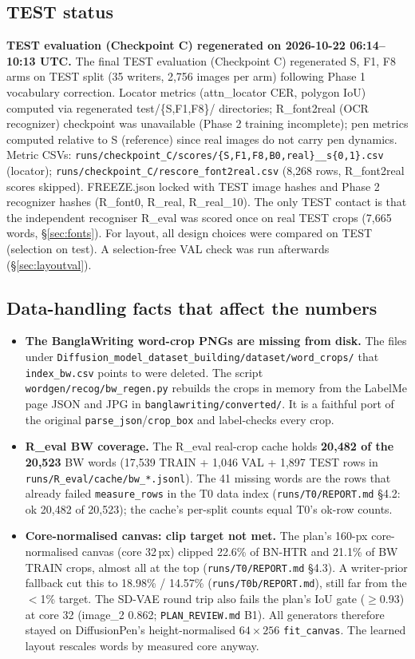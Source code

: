 \documentclass[10.5pt,a4paper]{article}
\newcommand{\fp}[1]{\nolinkurl{#1}}
\begin{document}
\subsection{TEST status}
\textbf{TEST evaluation (Checkpoint C) regenerated on 2026-10-22 06:14--10:13 UTC.} The final TEST evaluation
(Checkpoint C) regenerated S, F1, F8 arms on TEST split (35 writers, 2,756 images per arm) following Phase 1
vocabulary correction. Locator metrics (attn\_locator CER, polygon IoU) computed via regenerated test/\{S,F1,F8\}/
directories; R\_font2real (OCR recognizer) checkpoint was unavailable (Phase 2 training incomplete); pen metrics
computed relative to S (reference) since real images do not carry pen dynamics. Metric CSVs:
\fp{runs/checkpoint\_C/scores/\{S,F1,F8,B0,real\}\_\_s\{0,1\}.csv} (locator);
\fp{runs/checkpoint\_C/rescore\_font2real.csv} (8,268 rows, R\_font2real scores skipped).
FREEZE.json locked with TEST image hashes and Phase 2 recognizer hashes (R\_font0, R\_real, R\_real\_10).
The only TEST contact is that the independent recogniser R\_eval was scored once on real TEST crops (7,665 words,
\S\ref{sec:fonts}). For layout, all design choices were compared on TEST (selection on test). A selection-free VAL
check was run afterwards (\S\ref{sec:layoutval}).

\subsection{Data-handling facts that affect the numbers}
\begin{itemize}
\item \textbf{The BanglaWriting word-crop PNGs are missing from disk.} The files under
  \fp{Diffusion_model_dataset_building/dataset/word_crops/} that \fp{index_bw.csv} points to were deleted. The script
  \fp{wordgen/recog/bw_regen.py} rebuilds the crops in memory from the LabelMe page JSON and JPG in
  \fp{banglawriting/converted/}. It is a faithful port of the original \texttt{parse\_json}/\texttt{crop\_box} and
  label-checks every crop.
\item \textbf{R\_eval BW coverage.} The R\_eval real-crop cache holds \textbf{20,482 of the 20,523} BW words (17,539 TRAIN +
  1,046 VAL + 1,897 TEST rows in \fp{runs/R_eval/cache/bw_*.jsonl}). The 41 missing words are the rows that already failed
  \texttt{measure\_rows} in the T0 data index (\fp{runs/T0/REPORT.md} \S4.2: ok 20,482 of 20,523); the cache's per-split
  counts equal T0's ok-row counts.
\item \textbf{Core-normalised canvas: clip target not met.} The plan's 160-px core-normalised canvas (core 32\,px) clipped
  22.6\% of BN-HTR and 21.1\% of BW TRAIN crops, almost all at the top (\fp{runs/T0/REPORT.md} \S4.3). A writer-prior fallback
  cut this to 18.98\% / 14.57\% (\fp{runs/T0b/REPORT.md}), still far from the $<$1\% target. The SD-VAE round trip also fails
  the plan's IoU gate ($\ge$0.93) at core 32 (image\_2 0.862; \fp{PLAN_REVIEW.md} B1). All generators therefore stayed on
  DiffusionPen's height-normalised $64\times256$ \texttt{fit\_canvas}. The learned layout rescales words by measured core
  anyway.
\end{itemize}
\end{document}
